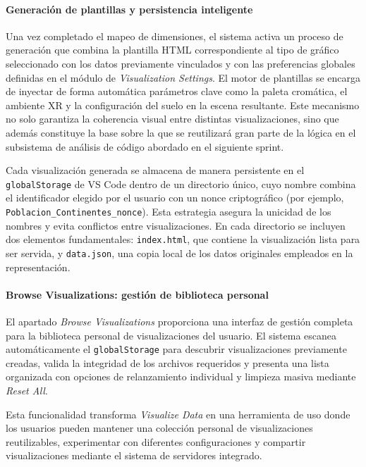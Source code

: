 \documentclass[a4paper, 12pt]{book}
\begin{document}
\paragraph{Generación de plantillas y persistencia inteligente}
Una vez completado el mapeo de dimensiones, el sistema activa un proceso de generación que combina la plantilla HTML correspondiente al tipo de gráfico seleccionado con los datos previamente vinculados y con las preferencias globales definidas en el módulo de \emph{Visualization Settings}. El motor de plantillas se encarga de inyectar de forma automática parámetros clave como la paleta cromática, el ambiente XR y la configuración del suelo en la escena resultante. Este mecanismo no solo garantiza la coherencia visual entre distintas visualizaciones, sino que además constituye la base sobre la que se reutilizará gran parte de la lógica en el subsistema de análisis de código abordado en el siguiente sprint.

Cada visualización generada se almacena de manera persistente en el \texttt{globalStorage} de VS Code dentro de un directorio único, cuyo nombre combina el identificador elegido por el usuario con un nonce criptográfico (por ejemplo, \texttt{Poblacion\_Continentes\_{nonce}}). Esta estrategia asegura la unicidad de los nombres y evita conflictos entre visualizaciones. En cada directorio se incluyen dos elementos fundamentales: \texttt{index.html}, que contiene la visualización lista para ser servida, y \texttt{data.json}, una copia local de los datos originales empleados en la representación.

\paragraph{Browse Visualizations: gestión de biblioteca personal}
El apartado \emph{Browse Visualizations} proporciona una interfaz de gestión completa para la biblioteca personal de visualizaciones del usuario. El sistema escanea automáticamente el \texttt{globalStorage} para descubrir visualizaciones previamente creadas, valida la integridad de los archivos requeridos y presenta una lista organizada con opciones de relanzamiento individual y limpieza masiva mediante \emph{Reset All}.

Esta funcionalidad transforma \emph{Visualize Data} en una herramienta de uso donde los usuarios pueden mantener una colección personal de visualizaciones reutilizables, experimentar con diferentes configuraciones y compartir visualizaciones mediante el sistema de servidores integrado.
\end{document}
